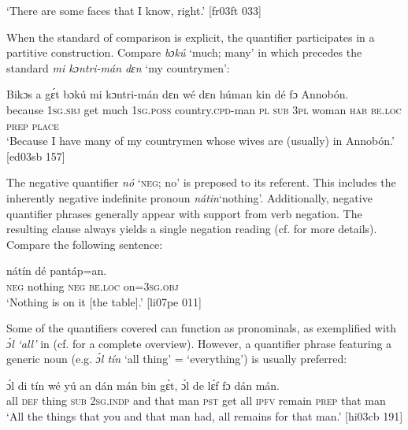 \glt ‘There are some faces that I know, right.’ [fr03ft 033]
\z

When the standard of comparison is explicit, the quantifier participates in a partitive construction. Compare \textit{bɔkú} ‘much; many’ in  which precedes the standard \textit{mi kɔntri-mán dɛn} ‘my countrymen’:


\ea%
    \label{ex:key:275}
    \gll Bikɔs  a    gɛ́t  bɔkú  mi    kɔntri-mán    dɛn  
wé  dɛn  húman  kin  dé    fɔ  Annobón.\\
because  \textsc{1sg.sbj}  get  much  \textsc{1sg.poss}  country.\textsc{cpd}{}-man  \textsc{pl}
\textsc{sub}  \textsc{3pl}  woman  \textsc{hab}  \textsc{be.loc}  \textsc{prep}  \textsc{place}\\
\glt ‘Because I have many of my countrymen whose wives are (usually) 
in Annobón.’ [ed03sb 157]
\z

The negative quantifier \textit{nó} ‘\textsc{neg}; no’ is preposed to its referent. This includes the inherently negative indefinite pronoun \textit{nátin}‘nothing’. Additionally, negative quantifier phrases generally appear with support from verb negation. The resulting clause always yields a single negation reading (cf.  for more details). Compare the following sentence: 


\ea%
    \label{ex:key:276}
    \gll {}  nátín    dé    pantáp=an.\\
\textsc{neg}  nothing  \textsc{neg}  \textsc{be.loc}  on=\textsc{3sg.obj}\\

\glt ‘Nothing is on it [the table].’ [li07pe 011]
\z

Some of the quantifiers covered can function as pronominals, as exemplified with \textit{ɔ́l}\textit{\textsuperscript{} }\textit{\textup{‘all’} }in  (cf.  for a complete overview). However, a quantifier phrase featuring a generic noun (e.g. \textit{ɔ́l tín} ‘all thing’ = ‘everything’) is usually preferred: 


\ea%
    \label{ex:key:277}
    \gll ɔ́l  di  tín    wé  yú    an  dán    mán    bin  gɛ́t,
ɔ́l  de  lɛ́f    fɔ  dán    mán.\\
all  \textsc{def}  thing  \textsc{sub}  \textsc{2sg.indp}  and  that    man    \textsc{pst}  get
all  \textsc{ipfv}  remain  \textsc{prep}   that  man \\

\glt ‘All the things that you and that man had, all remains for that man.’ [hi03cb 191]
\z


